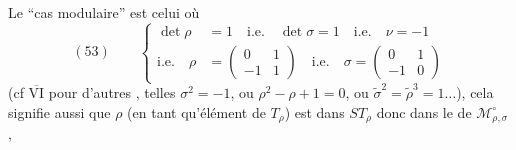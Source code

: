 Le ``cas modulaire'' est celui où
\[
(53)\qquad
\left\{\begin{aligned}
\det\rho&=1\quad\text{i.e.}\quad\det\sigma=1
\quad\text{i.e.}\quad\nu=-1\\
\text{i.e.}\quad\rho&=\begin{pmatrix}0&1\\-1&1\end{pmatrix}
\quad\text{i.e.}\quad\sigma=\begin{pmatrix}0&1\\-1&0\end{pmatrix}
\end{aligned}\right.
\]
(cf \uline{$\overline{\mathrm{VI}}$} pour d'autres
, telles
$\sigma^2=-1$, ou $\rho^2-\rho+1=0$, ou
$\widetilde\sigma^2=\widetilde\rho^3=1\ldots$),
cela signifie aussi que $\rho$ (en tant qu'élément de $T_\rho$)
est dans $ST_\rho$ donc dans le  de $\mathcal M_{\rho,\sigma}^{\circ}$,

\par{}


